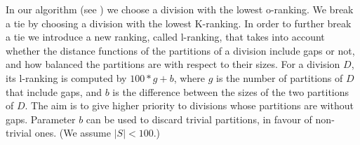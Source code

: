 \noindent
In our algorithm (see ) we
choose a division with the lowest o-ranking.
We break a tie by choosing a division with the lowest K-ranking.
In order to further break a tie we introduce a new ranking, called l-ranking,
that takes into account whether the distance functions of the
partitions of a division include gaps or not, and how balanced the
partitions are with respect to their sizes.
For a division $D$, its l-ranking is computed by
$100*g+b$, where $g$ is the number of partitions of $D$
that include gaps, and $b$
is the difference between the sizes of the two partitions of $D$.
The aim is to give higher priority to divisions whose partitions are
without gaps. Parameter $b$
can be used to discard trivial partitions, in favour of non-trivial
ones. (We assume $| S | < 100$.)



